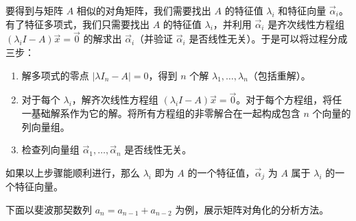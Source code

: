 要得到与矩阵 $A$ 相似的对角矩阵，我们需要找出 $A$ 的特征值 $\lambda_i$ 和特征向量 $\vec \alpha_i$。有了特征多项式，我们只需要找出 $A$ 的特征值 $\lambda_i$，并利用 $\vec \alpha_i$ 是齐次线性方程组 $(\lambda_i I - A) \vec x = \vec 0$ 的解求出 $\vec \alpha_i$（并验证 $\vec \alpha_i$ 是否线性无关）。于是可以将过程分成三步：
\begin{enumerate}
	\item 解多项式的零点 $|\lambda I_n - A| = 0$，得到 $n$ 个解 $\lambda_1, \ldots, \lambda_n$（包括重解）。
	\item 对于每个 $\lambda_i$，解齐次线性方程组 $(\lambda_i I - A) \vec x = \vec 0$。对于每个方程组，将任一基础解系作为它的解。将所有方程组的非零解合在一起构成包含 $n$ 个向量的列向量组。
	\item 检查列向量组 $\vec \alpha_1, \ldots, \vec \alpha_n$ 是否线性无关。
\end{enumerate}

如果以上步骤能顺利进行，那么 $\lambda_i$ 即为 $A$ 的一个特征值，$\vec \alpha_j$ 为 $A$ 属于 $\lambda_i$ 的一个特征向量。

\bigskip

下面以斐波那契数列 $a_n = a_{n - 1} + a_{n - 2}$ 为例，展示矩阵对角化的分析方法。

